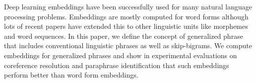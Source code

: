 Deep learning embeddings have been successfully used for many natural language processing problems. Embeddings are mostly computed for word forms although lots of recent papers have extended this to other linguistic units like morphemes and word sequences. In this paper, we define the concept of generalized phrase that includes conventional linguistic phrases as well as skip-bigrams. We compute embeddings for generalized phrases and show in experimental evaluations on coreference resolution and paraphrase identification that such embeddings perform better than word form embeddings.
